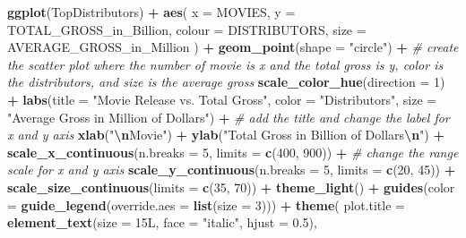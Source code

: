 \documentclass[
]{article}
\newenvironment{Shaded}{\begin{snugshade}}{\end{snugshade}}
\newcommand{\AttributeTok}[1]{\textcolor[rgb]{0.13,0.29,0.53}{#1}}
\newcommand{\CommentTok}[1]{\textcolor[rgb]{0.56,0.35,0.01}{\textit{#1}}}
\newcommand{\DecValTok}[1]{\textcolor[rgb]{0.00,0.00,0.81}{#1}}
\newcommand{\FloatTok}[1]{\textcolor[rgb]{0.00,0.00,0.81}{#1}}
\newcommand{\FunctionTok}[1]{\textcolor[rgb]{0.13,0.29,0.53}{\textbf{#1}}}
\newcommand{\NormalTok}[1]{#1}
\newcommand{\SpecialCharTok}[1]{\textcolor[rgb]{0.81,0.36,0.00}{\textbf{#1}}}
\newcommand{\StringTok}[1]{\textcolor[rgb]{0.31,0.60,0.02}{#1}}
\begin{document}
\begin{Shaded}
\begin{Highlighting}[]
\FunctionTok{ggplot}\NormalTok{(TopDistributors) }\SpecialCharTok{+}
  \FunctionTok{aes}\NormalTok{(}
    \AttributeTok{x =}\NormalTok{ MOVIES,}
    \AttributeTok{y =}\NormalTok{ TOTAL\_GROSS\_in\_Billion,}
    \AttributeTok{colour =}\NormalTok{ DISTRIBUTORS,}
    \AttributeTok{size =}\NormalTok{ AVERAGE\_GROSS\_in\_Million}
\NormalTok{  ) }\SpecialCharTok{+}
  \FunctionTok{geom\_point}\NormalTok{(}\AttributeTok{shape =} \StringTok{"circle"}\NormalTok{) }\SpecialCharTok{+} \CommentTok{\# create the scatter plot where the number of movie is x and the total gross is y, color is the distributors, and size is the average gross}
  \FunctionTok{scale\_color\_hue}\NormalTok{(}\AttributeTok{direction =} \DecValTok{1}\NormalTok{) }\SpecialCharTok{+}
  \FunctionTok{labs}\NormalTok{(}\AttributeTok{title =} \StringTok{"Movie Release vs. Total Gross"}\NormalTok{, }\AttributeTok{color =} \StringTok{"Distributors"}\NormalTok{, }\AttributeTok{size =} \StringTok{"Average Gross in Million of Dollars"}\NormalTok{) }\SpecialCharTok{+} \CommentTok{\# add the title and change the label for x and y axis}
  \FunctionTok{xlab}\NormalTok{(}\StringTok{"}\SpecialCharTok{\textbackslash{}n}\StringTok{Movie"}\NormalTok{) }\SpecialCharTok{+}
  \FunctionTok{ylab}\NormalTok{(}\StringTok{"Total Gross in Billion of Dollars}\SpecialCharTok{\textbackslash{}n}\StringTok{"}\NormalTok{) }\SpecialCharTok{+}
  \FunctionTok{scale\_x\_continuous}\NormalTok{(}\AttributeTok{n.breaks =} \DecValTok{5}\NormalTok{, }\AttributeTok{limits =} \FunctionTok{c}\NormalTok{(}\DecValTok{400}\NormalTok{, }\DecValTok{900}\NormalTok{)) }\SpecialCharTok{+}  \CommentTok{\# change the range scale for x and y axis}
  \FunctionTok{scale\_y\_continuous}\NormalTok{(}\AttributeTok{n.breaks =} \DecValTok{5}\NormalTok{, }\AttributeTok{limits =} \FunctionTok{c}\NormalTok{(}\DecValTok{20}\NormalTok{, }\DecValTok{45}\NormalTok{)) }\SpecialCharTok{+}
  \FunctionTok{scale\_size\_continuous}\NormalTok{(}\AttributeTok{limits =} \FunctionTok{c}\NormalTok{(}\DecValTok{35}\NormalTok{, }\DecValTok{70}\NormalTok{)) }\SpecialCharTok{+}
  \FunctionTok{theme\_light}\NormalTok{() }\SpecialCharTok{+}
  \FunctionTok{guides}\NormalTok{(}\AttributeTok{color =} \FunctionTok{guide\_legend}\NormalTok{(}\AttributeTok{override.aes =} \FunctionTok{list}\NormalTok{(}\AttributeTok{size =} \DecValTok{3}\NormalTok{))) }\SpecialCharTok{+}
  \FunctionTok{theme}\NormalTok{(}
    \AttributeTok{plot.title =} \FunctionTok{element\_text}\NormalTok{(}\AttributeTok{size =}\NormalTok{ 15L,}
    \AttributeTok{face =} \StringTok{"italic"}\NormalTok{,}
    \AttributeTok{hjust =} \FloatTok{0.5}\NormalTok{),}

\end{Highlighting}
\end{Shaded}
\end{document}
